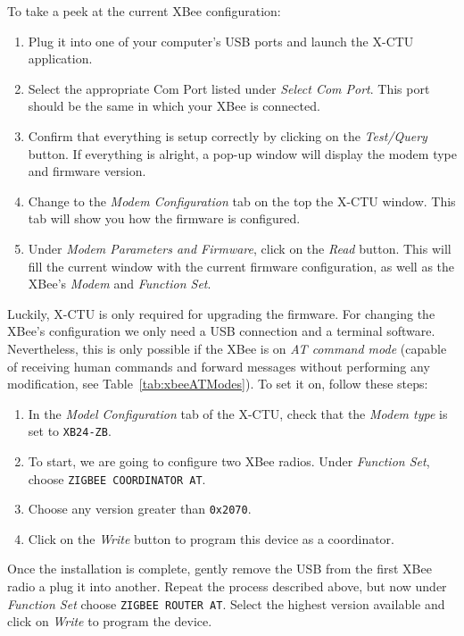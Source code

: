 To take a peek at the current XBee configuration: 

\begin{enumerate}
	\item Plug it into one of your computer's USB ports and launch the X-CTU application.
	\item Select the appropriate Com Port listed under \emph{Select Com Port}. This port should be the same in which your XBee is connected.
	\item Confirm that everything is setup correctly by clicking on the \emph{Test/Query} button. If everything is alright, a pop-up window will display the modem type and firmware version.
	\item Change to the \emph{Modem Configuration} tab on the top the X-CTU window. This tab will show you how the firmware is configured.
	\item Under \emph{Modem Parameters and Firmware}, click on the \emph{Read} button. This will fill the current window with the current firmware configuration, as well as the XBee's \emph{Modem} and \emph{Function Set}.
\end{enumerate}

Luckily, X-CTU is only required for upgrading the firmware. For changing the XBee's configuration we only need a USB connection and a terminal software. Nevertheless, this is only possible if the XBee is on \emph{AT command mode} (capable of receiving human commands and forward messages without performing any modification, see Table~\ref{tab:xbeeATModes}). To set it on, follow these steps:

\begin{enumerate}
	\item In the \emph{Model Configuration} tab of the X-CTU, check that the \emph{Modem type} is set to \texttt{XB24-ZB}.
	\item To start, we are going to configure two XBee radios. Under \emph{Function Set}, choose \texttt{ZIGBEE COORDINATOR AT}.
	\item Choose any version greater than \texttt{0x2070}.
	\item Click on the \emph{Write} button to program this device as a coordinator.
\end{enumerate}

Once the installation is complete, gently remove the USB from the first XBee radio a plug it into another. Repeat the process described above, but now under \emph{Function Set} choose \texttt{ZIGBEE ROUTER AT}. Select the highest version available and click on \emph{Write} to program the device.

